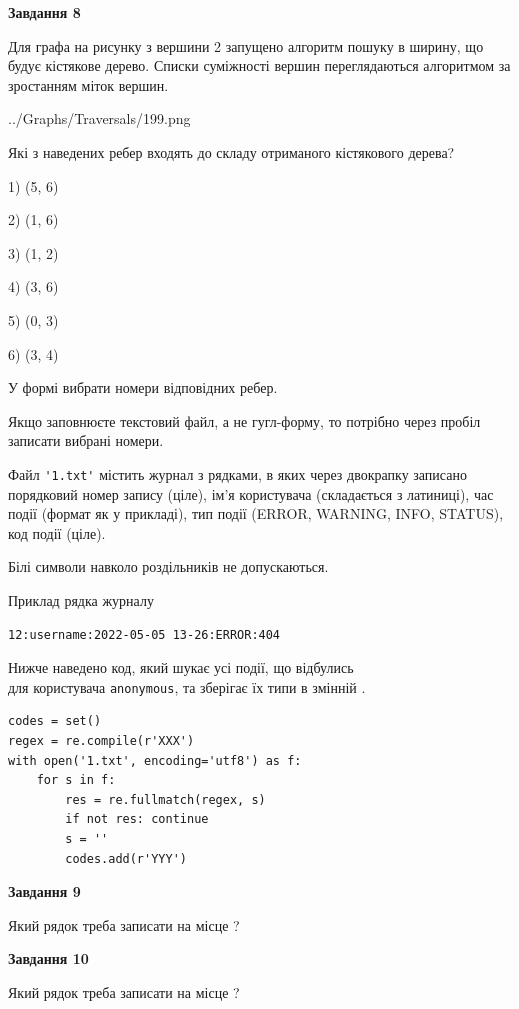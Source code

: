 \documentclass[12pt, ukrainian]{article}
\def\code#1{\Verb!#1!}
\begin{document}
{\begin {large}
{\begin {center}\textbf{Завдання 8}\end {center}}\par
Для графа на рисунку з вершини 2 запущено алгоритм пошуку в ширину, що будує кістякове дерево. Списки суміжності вершин переглядаються алгоритмом за зростанням міток вершин.\par
\begin{center}
	{../Graphs/Traversals/199.png}
\end{center}
\par Які з наведених ребер входять до складу отриманого кістякового дерева?\par
1) (5, 6)\par
2) (1, 6)\par
3) (1, 2)\par
4) (3, 6)\par
5) (0, 3)\par
6) (3, 4)\par
{\vskip 15pt} У формі вибрати номери відповідних ребер.


Якщо заповнюєте текстовий файл, а не гугл-форму, то потрібно через пробіл записа\-ти вибрані номери.\par
\newpage


Файл \code{'1.txt'} містить журнал з рядками, в яких через двокрапку записано поряд\-ко\-вий номер запису (ціле), ім'я користувача (складається з латиниці), час події (фор\-мат як у прикладі), тип події (ERROR, WARNING, INFO, STATUS), код події (ціле).

Білі символи навколо роздільників не допускаються.

Приклад рядка журналу



\begin{verbatim}
12:username:2022-05-05 13-26:ERROR:404
\end{verbatim}


Нижче наведено код, який шукає усі події, що відбулись\\ для користувача \code{anonymous}, та зберігає їх типи в змінній .



\begin{verbatim}
codes = set()
regex = re.compile(r'XXX')
with open('1.txt', encoding='utf8') as f:
    for s in f:
        res = re.fullmatch(regex, s)
        if not res: continue
        s = ''
        codes.add(r'YYY')
\end{verbatim}


{\begin {center}\textbf{Завдання 9}\end {center}}\par
Який рядок треба записати на місце  ?\par
\vspace{5mm}


{\begin {center}\textbf{Завдання 10}\end {center}}\par
Який рядок треба записати на місце  ?\par


\newpage


\end {large}}
\end{document}
